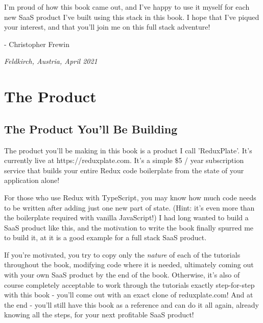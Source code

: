 \documentclass[a4paper,
                             oneside,
                             BCOR1.0cm,
                             DIV11,
                             parskip=full,
                             11pt]{scrbook}
\begin{document}

I'm proud of how this book came out, and I've happy to use it myself for each new SaaS product I've built using this stack in this book. I hope that I've piqued your interest, and that you'll join me on this full stack adventure!

- Christopher Frewin

\textit{Feldkirch, Austria, April 2021}

\chapter{The Product}\label{cap:primer}

\section{The Product You'll Be Building}\label{sec:titles}

The product you'll be making in this book is a product I call 'ReduxPlate'. It's currently live at https://reduxplate.com. It's a simple \$5 / year subscription service that builds your entire Redux code boilerplate from the state of your application alone! 

For those who use Redux with TypeScript, you may know how much code needs to be written after adding just one new part of state. (Hint: it's even more than the boilerplate required with vanilla JavaScript!) I had long wanted to build a SaaS product like this, and the motivation to write the book finally spurred me to build it, at it is a good example for a full stack SaaS product. 


If you're motivated, you try to copy only the \textit{nature} of each of the tutorials throughout the book, modifying code where it is needed, ultimately coming out with your own SaaS product by the end of the book. Otherwise, it's also of course completely acceptable to work through the tutorials exactly step-for-step with this book - you'll come out with an exact clone of reduxplate.com! And at the end - you'll still have this book as a reference and can do it all again, already knowing all the steps, for your next profitable SaaS product!
\end{document}
